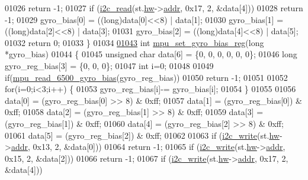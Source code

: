 \begin{DoxyCode}
{{{{01026         \textcolor{keywordflow}{return} -1;
01027     \textcolor{keywordflow}{if} (\hyperlink{_i2_c_8c_ac2d47e7a6c76f93f9b537c31a2986e7b}{i2c\_read}(st.\hyperlink{structgyro__state__s_a5bac30a96752691e4cc723735060e360}{hw}->\hyperlink{structhw__s_a4c34a946600e9d68b6355d23f54d291b}{addr}, 0x17, 2, &data[4]))
01028         \textcolor{keywordflow}{return} -1;
01029     gyro\_bias[0] = ((long)data[0]<<8) | data[1];
01030     gyro\_bias[1] = ((long)data[2]<<8) | data[3];
01031     gyro\_bias[2] = ((long)data[4]<<8) | data[5];
01032     \textcolor{keywordflow}{return} 0;
01033 \}
01034 
\hypertarget{inv__mpu_8c_source.tex_l01043}{}\hyperlink{group___d_r_i_v_e_r_s_ga01361a0f5c1f048cb0742bd3d0e4d3a5}{01043} \textcolor{keywordtype}{int} \hyperlink{group___d_r_i_v_e_r_s_ga01361a0f5c1f048cb0742bd3d0e4d3a5}{mpu\_set\_gyro\_bias\_reg}(\textcolor{keywordtype}{long} *gyro\_bias)
01044 \{
01045     \textcolor{keywordtype}{unsigned} \textcolor{keywordtype}{char} data[6] = \{0, 0, 0, 0, 0, 0\};
01046     \textcolor{keywordtype}{long} gyro\_reg\_bias[3] = \{0, 0, 0\};
01047     \textcolor{keywordtype}{int} i=0;
01048 
01049     \textcolor{keywordflow}{if}(\hyperlink{inv__mpu_8c_ae387f1342e10bce129609f3c279a50a2}{mpu\_read\_6500\_gyro\_bias}(gyro\_reg\_bias))
01050         \textcolor{keywordflow}{return} -1;
01051 
01052     \textcolor{keywordflow}{for}(i=0;i<3;i++) \{
01053         gyro\_reg\_bias[i]-= gyro\_bias[i];
01054     \}
01055 
01056     data[0] = (gyro\_reg\_bias[0] >> 8) & 0xff;
01057     data[1] = (gyro\_reg\_bias[0]) & 0xff;
01058     data[2] = (gyro\_reg\_bias[1] >> 8) & 0xff;
01059     data[3] = (gyro\_reg\_bias[1]) & 0xff;
01060     data[4] = (gyro\_reg\_bias[2] >> 8) & 0xff;
01061     data[5] = (gyro\_reg\_bias[2]) & 0xff;
01062 
01063     \textcolor{keywordflow}{if} (\hyperlink{_i2_c_8c_ac0f145afe8d662af199043939f4398d6}{i2c\_write}(st.\hyperlink{structgyro__state__s_a5bac30a96752691e4cc723735060e360}{hw}->\hyperlink{structhw__s_a4c34a946600e9d68b6355d23f54d291b}{addr}, 0x13, 2, &data[0]))
01064         \textcolor{keywordflow}{return} -1;
01065     \textcolor{keywordflow}{if} (\hyperlink{_i2_c_8c_ac0f145afe8d662af199043939f4398d6}{i2c\_write}(st.\hyperlink{structgyro__state__s_a5bac30a96752691e4cc723735060e360}{hw}->\hyperlink{structhw__s_a4c34a946600e9d68b6355d23f54d291b}{addr}, 0x15, 2, &data[2]))
01066         \textcolor{keywordflow}{return} -1;
01067     \textcolor{keywordflow}{if} (\hyperlink{_i2_c_8c_ac0f145afe8d662af199043939f4398d6}{i2c\_write}(st.\hyperlink{structgyro__state__s_a5bac30a96752691e4cc723735060e360}{hw}->\hyperlink{structhw__s_a4c34a946600e9d68b6355d23f54d291b}{addr}, 0x17, 2, &data[4]))
}}}}
\end{DoxyCode}
